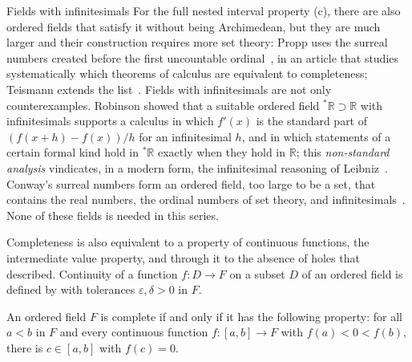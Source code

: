 \begin{note}{Fields with infinitesimals}
For the full nested interval property (c), there are also ordered fields that satisfy it without being Archimedean, but they are much larger and their construction requires more set theory: Propp uses the surreal numbers created before the first uncountable ordinal~\cite{propp2013}, in an article that studies systematically which theorems of calculus are equivalent to completeness; Teismann extends the list~\cite{teismann2013}. Fields with infinitesimals are not only counterexamples. Robinson showed that a suitable ordered field ${}^*\mathbb R\supset\mathbb R$ with infinitesimals supports a calculus in which $f'(x)$ is the standard part of $(f(x+h)-f(x))/h$ for an infinitesimal $h$, and in which statements of a certain formal kind hold in ${}^*\mathbb R$ exactly when they hold in $\mathbb R$; this \emph{non-standard analysis} vindicates, in a modern form, the infinitesimal reasoning of Leibniz~\cite{robinson1966}. Conway's surreal numbers form an ordered field, too large to be a set, that contains the real numbers, the ordinal numbers of set theory, and infinitesimals~\cite{conway1976}. None of these fields is needed in this series.
\end{note}

Completeness is also equivalent to a property of continuous functions, the intermediate value property, and through it to the absence of holes that  described. Continuity of a function $f\colon D\to F$ on a subset $D$ of an ordered field is defined by  with tolerances $\varepsilon,\delta>0$ in $F$.

\begin{proposition}
\label{prop:ivt-completeness}
An ordered field $F$ is complete if and only if it has the following property: for all $a<b$ in $F$ and every continuous function $f\colon[a,b]\to F$ with $f(a)<0<f(b)$, there is $c\in[a,b]$ with $f(c)=0$.
\end{proposition}

